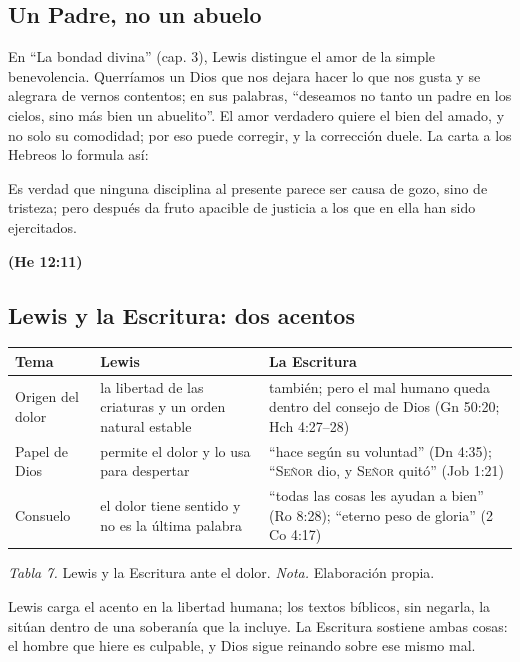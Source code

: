 \documentclass[11pt,letterpaper]{article}
\newcommand{\SENOR}{\textsc{Señor}}
\newcommand{\fuente}[1]{\par\hfill{\upshape\bfseries\small\textcolor{azul}{#1}}}
\begin{document}
\subsection{Un Padre, no un abuelo}
En ``La bondad divina'' (cap. 3), Lewis distingue el amor de la simple benevolencia. Querríamos un Dios que nos dejara hacer lo que nos gusta y se alegrara de vernos contentos; en sus palabras, ``deseamos no tanto un padre en los cielos, sino más bien un abuelito''. El amor verdadero quiere el bien del amado, y no solo su comodidad; por eso puede corregir, y la corrección duele. La carta a los Hebreos lo formula así:

\begin{cita}Es verdad que ninguna disciplina al presente parece ser causa de gozo, sino de tristeza; pero después da fruto apacible de justicia a los que en ella han sido ejercitados.\fuente{(He 12:11)}\end{cita}

\subsection{Lewis y la Escritura: dos acentos}
\begin{center}\small\renewcommand{\arraystretch}{1.2}
\begin{tabular}{@{}L{2.8cm}L{5.0cm}L{6.0cm}@{}}
\toprule
\textbf{Tema} & \textbf{Lewis} & \textbf{La Escritura} \\ \midrule
Origen del dolor & la libertad de las criaturas y un orden natural estable & también; pero el mal humano queda dentro del consejo de Dios (Gn 50:20; Hch 4:27--28) \\
Papel de Dios & permite el dolor y lo usa para despertar & ``hace según su voluntad'' (Dn 4:35); ``\SENOR{} dio, y \SENOR{} quitó'' (Job 1:21) \\
Consuelo & el dolor tiene sentido y no es la última palabra & ``todas las cosas les ayudan a bien'' (Ro 8:28); ``eterno peso de gloria'' (2 Co 4:17) \\
\bottomrule
\end{tabular}\par
{\footnotesize\color{gris}\textit{Tabla 7.} Lewis y la Escritura ante el dolor. \textit{Nota.} Elaboración propia.}
\end{center}

Lewis carga el acento en la libertad humana; los textos bíblicos, sin negarla, la sitúan dentro de una soberanía que la incluye. La Escritura sostiene ambas cosas: el hombre que hiere es culpable, y Dios sigue reinando sobre ese mismo mal.
\end{document}
